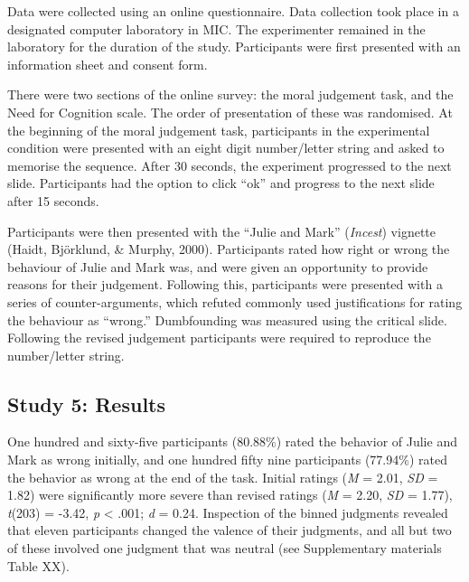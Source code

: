 \documentclass[
  american,
  man,floatsintext]{apa7}
\begin{document}
Data were collected using an online questionnaire. Data collection took place in a designated computer laboratory in MIC. The experimenter remained in the laboratory for the duration of the study. Participants were first presented with an information sheet and consent form.

There were two sections of the online survey: the moral judgement task, and the Need for Cognition scale. The order of presentation of these was randomised. At the beginning of the moral judgement task, participants in the experimental condition were presented with an eight digit number/letter string and asked to memorise the sequence. After 30 seconds, the experiment progressed to the next slide. Participants had the option to click ``ok'' and progress to the next slide after 15 seconds.

Participants were then presented with the ``Julie and Mark'' (\emph{Incest}) vignette (Haidt, Björklund, \& Murphy, 2000). Participants rated how right or wrong the behaviour of Julie and Mark was, and were given an opportunity to provide reasons for their judgement. Following this, participants were presented with a series of counter-arguments, which refuted commonly used justifications for rating the behaviour as ``wrong.'' Dumbfounding was measured using the critical slide. Following the revised judgement participants were required to reproduce the number/letter string.

\hypertarget{study-5-results}{%
\subsection{Study 5: Results}\label{study-5-results}}

One hundred and sixty-five participants (80.88\%) rated the behavior of Julie and Mark as wrong initially, and one hundred fifty nine participants (77.94\%) rated the behavior as wrong at the end of the task. Initial ratings (\emph{M} = 2.01, \emph{SD} = 1.82) were significantly more severe than revised ratings (\emph{M} = 2.20, \emph{SD} = 1.77), \emph{t}(203) = -3.42, \emph{p} \textless{} .001; \emph{d} = 0.24. Inspection of the binned judgments revealed that eleven participants changed the valence of their judgments, and all but two of these involved one judgment that was neutral (see Supplementary materials Table XX).
\end{document}
